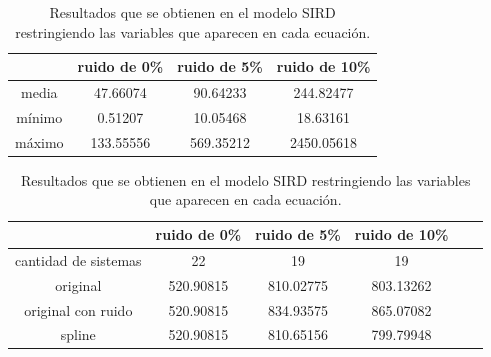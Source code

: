 \begin{table}[!h]
    \centering
    \caption{Resultados que se obtienen en el modelo SIRD restringiendo las variables que aparecen en cada ecuación.}
    \begin{tabular}{|c|c|c|c|}
        \hline
               & \textbf{ruido de 0\%} & \textbf{ruido de 5\%} & \textbf{ruido de 10\%} \\
        \hline
        media  & 47.66074              & 90.64233              & 244.82477              \\
        \hline
        mínimo & 0.51207               & 10.05468              & 18.63161               \\
        \hline
        máximo & 133.55556             & 569.35212             & 2450.05618             \\
        \hline
    \end{tabular}

    \begin{tabular}{|c|c|c|c|c|c|}
        \hline
                             & \textbf{ruido de 0\%} & \textbf{ruido de 5\%} & \textbf{ruido de 10\%} \\
        \hline
        cantidad de sistemas & 22                    & 19                    & 19                     \\
        \hline
        original             & 520.90815             & 810.02775             & 803.13262              \\
        \hline
        original con ruido   & 520.90815             & 834.93575             & 865.07082              \\
        \hline
        spline               & 520.90815             & 810.65156             & 799.79948              \\
        \hline
    \end{tabular}
    \label{table:experiment_SIRD}
\end{table}


